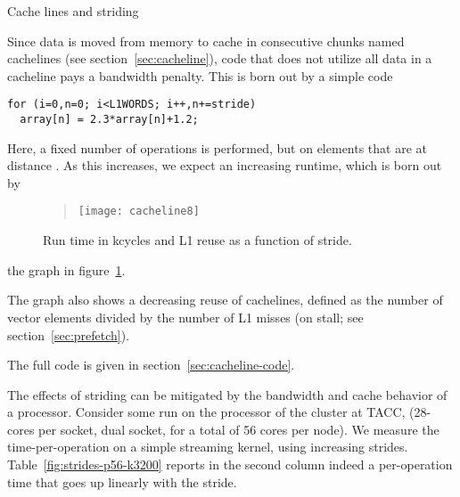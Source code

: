  {Cache lines and striding}
\label{sec:coding-cacheline}

Since data is moved from memory to cache in consecutive chunks named
cachelines (see section~\ref{sec:cacheline}), code that does not
utilize all data in a cacheline pays a bandwidth penalty. This is born
out by a simple code
\begin{verbatim}
for (i=0,n=0; i<L1WORDS; i++,n+=stride)
  array[n] = 2.3*array[n]+1.2;
\end{verbatim}
Here, a fixed number of operations is performed, but on elements that
are at distance . As this  increases, we expect an
increasing runtime, which is born out by
\begin{figure}[ht]
  \begin{quote}
  \texttt{[image: cacheline8]}
  \end{quote}
  \caption{Run time in kcycles and L1 reuse as a function of stride.}
  \label{fig:cacheline}
\end{figure}
the graph in figure~\ref{fig:cacheline}.

The graph also shows a decreasing reuse of cachelines, defined as the
number of vector elements divided by the number of L1 misses (on
stall; see section~\ref{sec:prefetch}). 



The full code is given in section~\ref{sec:cacheline-code}.

The effects of striding can be mitigated by the bandwidth
and cache behavior of a processor.
Consider some run on the  processor
of the  cluster at TACC,
(28-cores per socket, dual socket, for a total of 56 cores per node).
We measure the time-per-operation on a simple streaming kernel,
using increasing strides. 
Table~\ref{fig:strides-p56-k3200} reports in the second column
indeed a per-operation time that goes up linearly with the stride.


